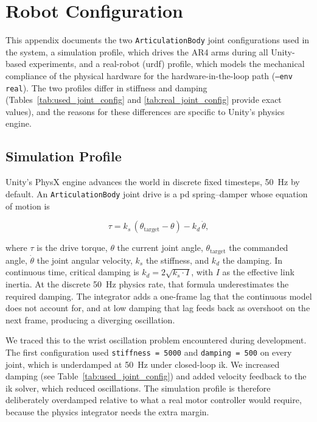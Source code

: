 \chapter{Robot Configuration}\label{appendix:robot_values}
This appendix documents the two \texttt{ArticulationBody} joint configurations used in the system, a simulation profile, which drives the AR4 arms during all Unity-based experiments, and a real-robot (\gls{urdf}) profile, which models the mechanical compliance of the physical hardware for the hardware-in-the-loop path (\texttt{--env real}). The two profiles differ in stiffness and damping (Tables~\ref{tab:used_joint_config} and \ref{tab:real_joint_config} provide exact values), and the reasons for these differences are specific to Unity's physics engine.

\section{Simulation Profile}
Unity's PhysX engine advances the world in discrete fixed timesteps, 50~Hz by default. An \texttt{ArticulationBody} joint drive is a \gls{pd} spring--damper whose equation of motion is

\begin{equation}
	\tau = k_s \, (\theta_{\text{target}} - \theta) - k_d \, \dot{\theta},
\end{equation}

where $\tau$ is the drive torque, $\theta$ the current joint angle, $\theta_{\text{target}}$ the commanded angle, $\dot{\theta}$ the joint angular velocity, $k_s$ the stiffness, and $k_d$ the damping. In continuous time, critical damping is $k_d = 2\sqrt{k_s \cdot I}$, with $I$ as the effective link inertia. At the discrete 50~Hz physics rate, that formula underestimates the required damping. The integrator adds a one-frame lag that the continuous model does not account for, and at low damping that lag feeds back as overshoot on the next frame, producing a diverging oscillation.

We traced this to the wrist oscillation problem encountered during development. The first configuration used \texttt{stiffness = 5000} and \texttt{damping = 500} on every joint, which is underdamped at 50~Hz under closed-loop \gls{ik}. We increased damping (see Table~\ref{tab:used_joint_config}) and added velocity feedback to the \gls{ik} solver, which reduced oscillations. The simulation profile is therefore deliberately overdamped relative to what a real motor controller would require, because the physics integrator needs the extra margin.

